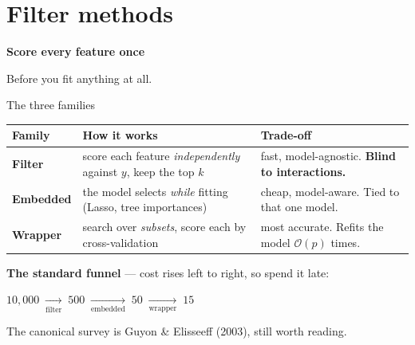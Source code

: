 \documentclass[aspectratio=169]{beamer}
\begin{document}
\section{Filter methods}

\begin{frame}[plain]
  \vfill
  \begin{center}
    {\Large\color{popblue}\textbf{Score every feature once}}\\[0.9em]
    \begin{minipage}{0.82\textwidth}\centering\small
      Before you fit anything at all.
    \end{minipage}
  \end{center}
  \vfill
\end{frame}

\begin{frame}{The three families}
  \begin{center}\small
    \renewcommand{\arraystretch}{1.2}
    \begin{tabular}{@{}p{2.4cm} p{5.0cm} p{5.4cm}@{}}
      \textbf{Family} & \textbf{How it works} & \textbf{Trade-off} \\ \hline
      \textbf{Filter} & score each feature \emph{independently} against $y$, keep the top $k$
        & fast, model-agnostic. \textbf{Blind to interactions.} \\
      \textbf{Embedded} & the model selects \emph{while} fitting (Lasso, tree importances)
        & cheap, model-aware. Tied to that one model. \\
      \textbf{Wrapper} & search over \emph{subsets}, score each by cross-validation
        & most accurate. Refits the model $\mathcal{O}(p)$ times. \\
    \end{tabular}
  \end{center}
  \vfill
  \textbf{The standard funnel} --- cost rises left to right, so spend it late:
  \begin{center}\small
    $10{,}000 \;\xrightarrow[\text{filter}]{}\; 500
     \;\xrightarrow[\text{embedded}]{}\; 50
     \;\xrightarrow[\text{wrapper}]{}\; 15$
  \end{center}
  \vfill
  \footnotesize The canonical survey is Guyon \& Elisseeff (2003), still worth reading.
\end{frame}
\end{document}
